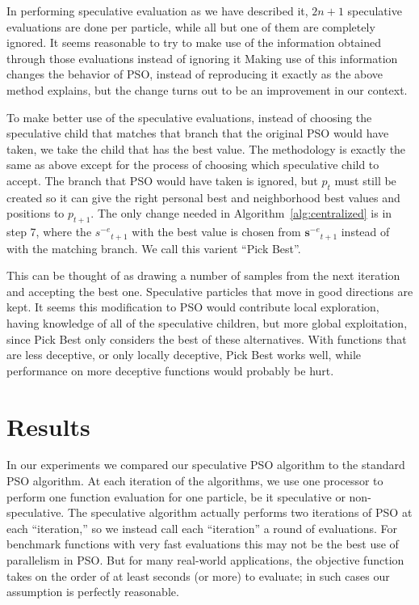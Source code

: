 \documentclass{llncs}
\newcommand{\alg}[1]{Algorithm~\ref{alg:#1}}
\providecommand{\noeval}[1]{\ensuremath{#1^{-e}}}
\providecommand{\p}{\ensuremath{p}}
\providecommand{\s}{\ensuremath{s}}
\providecommand{\sset}{\ensuremath{\mathbf{s}}}
\begin{document}
In performing speculative evaluation as we have described it, $2n+1$
speculative evaluations are done per particle, while all but one of them are
completely ignored.  It seems reasonable to try to make use of the
information obtained through those evaluations instead of ignoring it
Making use of this information changes the
behavior of PSO, instead of reproducing it exactly as the above method
explains, but the change turns out to be an improvement in our context.

To make better use of the speculative evaluations, instead of choosing the speculative
child that matches that branch that the original PSO would have taken, we take
the child that has the best value.  The methodology is exactly the same as
above except for the process of choosing which speculative child to accept.
The branch that PSO would have taken is ignored, but $\p_t$ must still be
created so it can give the right personal best and neighborhood best values and
positions to $\p_{t+1}$.  The only change needed in \alg{centralized} is in
step 7, where the $\noeval{\s}_{t+1}$ with the best value is chosen from
$\noeval{\sset}_{t+1}$ instead of with the matching branch. We call this
varient ``Pick Best''.

This can be thought of as drawing a number of samples from the next iteration
and accepting the best one.  Speculative particles that move in good directions
are kept.  It seems this modification to PSO would contribute local exploration,
having knowledge of all of the speculative children, but more global exploitation,
since Pick Best only considers the best of these alternatives.
With functions that are less deceptive, or only locally deceptive,
Pick Best works well, while performance on more deceptive
functions would probably be hurt.

\section{Results}
\label{sec:results}

In our experiments we compared our speculative PSO algorithm to the standard
PSO algorithm.  At each iteration of the algorithms, we use one processor to
perform one function evaluation for one particle, be it speculative or
non-speculative.  The speculative algorithm actually performs two iterations of
PSO at each ``iteration,'' so we instead call each ``iteration'' a round of
evaluations.  For benchmark functions with very fast evaluations this may not
be the best use of parallelism in PSO.  But for many real-world applications,
the objective function takes on the order of at least seconds (or more) to evaluate; in
such cases our assumption is perfectly reasonable.
\end{document}
